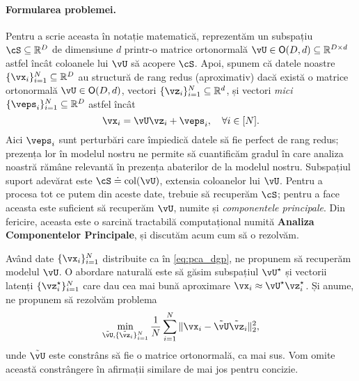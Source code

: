 \documentclass[../../book-main_ro.tex]{subfiles}
\begin{document}
\paragraph{Formularea problemei.}
Pentru a scrie aceasta în notație matematică, reprezentăm un subspațiu \(\cS \subseteq \R^{D}\) de dimensiune \(d\) printr-o matrice ortonormală \(\vU \in \O(D, d) \subseteq \R^{D \times d}\) astfel încât coloanele lui \(\vU\) să acopere \(\cS\). Apoi, spunem că datele noastre \(\{\vx_{i}\}_{i = 1}^{N} \subseteq \R^{D}\) au structură de rang redus (aproximativ) dacă există o matrice ortonormală \(\vU \in \O(D, d)\), vectori \(\{\vz_{i}\}_{i = 1}^{N} \subseteq \R^{d}\), și vectori \textit{mici} \(\{\veps_{i}\}_{i = 1}^{N} \subseteq \R^{D}\) astfel încât 
\begin{equation}\label{eq:pca_dgp}
    \vx_{i} = \vU\vz_{i} + \veps_{i}, \quad \forall i \in [N].
\end{equation}
Aici \(\veps_{i}\) sunt perturbări care împiedică datele să fie perfect
de rang redus; prezența lor în modelul nostru ne permite să cuantificăm gradul în care
analiza noastră rămâne relevantă în prezența abaterilor de la modelul nostru. Subspațiul
suport adevărat este \(\cS \doteq \mathop{\mathrm{col}}(\vU)\), extensia
coloanelor lui $\vU$. Pentru a procesa tot ce putem din
aceste date, trebuie să recuperăm \(\cS\); pentru a face aceasta este suficient să recuperăm
\(\vU\), numite și \textit{componentele principale}. Din fericire, aceasta este
o sarcină tractabilă computațional numită {\bf Analiza Componentelor Principale}, și
discutăm acum cum să o rezolvăm.

Având date \(\{\vx_{i}\}_{i = 1}^{N}\) distribuite ca în \eqref{eq:pca_dgp}, ne
propunem să recuperăm modelul \(\vU\). O abordare naturală este să găsim subspațiul
\(\vU^{\star}\) și vectorii latenți \(\{\vz_{i}^{\star}\}_{i = 1}^{N}\) care
dau cea mai bună aproximare \(\vx_{i} \approx \vU^{\star}\vz_{i}^{\star}\). Și anume, ne propunem să rezolvăm problema 
\begin{equation}\label{eq:pca_sparse_recovery_problem}
    \min_{\tilde{\vU}, \{\tilde{\vz}_{i}\}_{i = 1}^{N}}\frac{1}{N}\sum_{i = 1}^{N}\norm{\vx_{i} - \tilde{\vU}\tilde{\vz}_{i}}_{2}^{2},
\end{equation}
unde $\tilde{\vU}$ este constrâns să fie o matrice ortonormală, ca mai sus. Vom omite
această constrângere în afirmații similare de mai jos pentru concizie.
\end{document}

